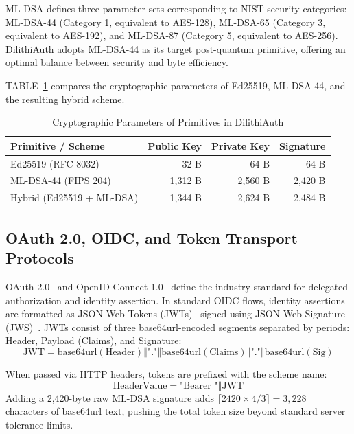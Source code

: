 \documentclass{article}
\begin{document}
\begin{IEEEkeywords}
ML-DSA defines three parameter sets corresponding to NIST security categories: ML-DSA-44 (Category 1, equivalent to AES-128), ML-DSA-65 (Category 3, equivalent to AES-192), and ML-DSA-87 (Category 5, equivalent to AES-256). DilithiAuth adopts ML-DSA-44 as its target post-quantum primitive, offering an optimal balance between security and byte efficiency.

TABLE~\ref{tab:crypto_primitives_comparison} compares the cryptographic parameters of Ed25519, ML-DSA-44, and the resulting hybrid scheme.

\begin{table}[htbp]
\caption{Cryptographic Parameters of Primitives in DilithiAuth}
\label{tab:crypto_primitives_comparison}
\centering
\begin{tabular}{lrrr}
\toprule
\textbf{Primitive / Scheme} & \textbf{Public Key} & \textbf{Private Key} & \textbf{Signature} \\
\midrule
Ed25519 (RFC 8032) & 32 B & 64 B & 64 B \\
ML-DSA-44 (FIPS 204) & 1,312 B & 2,560 B & 2,420 B \\
Hybrid (Ed25519 + ML-DSA) & 1,344 B & 2,624 B & 2,484 B \\
\bottomrule
\end{tabular}
\end{table}

\subsection{OAuth 2.0, OIDC, and Token Transport Protocols}
OAuth 2.0~\cite{rfc6749} and OpenID Connect 1.0~\cite{oidc_core} define the industry standard for delegated authorization and identity assertion. In standard OIDC flows, identity assertions are formatted as JSON Web Tokens (JWTs)~\cite{rfc7519} signed using JSON Web Signature (JWS)~\cite{rfc7515}. JWTs consist of three base64url-encoded segments separated by periods: Header, Payload (Claims), and Signature:
\begin{equation}
\text{JWT} = \text{base64url}(\text{Header}) \mathbin{\Vert} \text{"."} \mathbin{\Vert} \text{base64url}(\text{Claims}) \mathbin{\Vert} \text{"."} \mathbin{\Vert} \text{base64url}(\text{Sig})
\end{equation}

When passed via HTTP headers, tokens are prefixed with the scheme name:
\begin{equation}
\text{HeaderValue} = \text{"Bearer "} \mathbin{\Vert} \text{JWT}
\end{equation}
Adding a 2,420-byte raw ML-DSA signature adds $\lceil 2420 \times 4/3 \rceil = 3,228$ characters of base64url text, pushing the total token size beyond standard server tolerance limits.


\end{IEEEkeywords}
\end{document}
